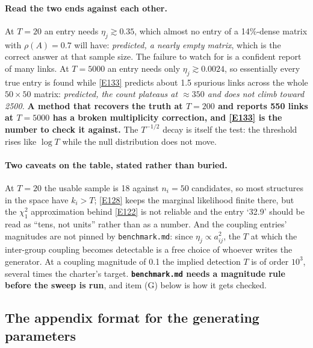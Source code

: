 \paragraph{Read the two ends against each other.} At $T=20$ an entry needs
$\eta_j\gtrsim0.35$, which almost no entry of a 14\%-dense matrix with $\rho(A)=0.7$
will have: \emph{predicted, a nearly empty matrix}, which is the correct answer at
that sample size. The failure to watch for is a confident report of many links. At
$T=5000$ an entry needs only $\eta_j\gtrsim0.0024$, so essentially every true entry
is found while \eqref{E133} predicts about 1.5 spurious links across the whole
$50\times50$ matrix: \emph{predicted, the count plateaus at $\approx350$ and does not
climb toward 2500.} \textbf{A method that recovers the truth at $T=200$ and reports
550 links at $T=5000$ has a broken multiplicity correction, and \eqref{E133} is the
number to check it against.} The $T^{-1/2}$ decay is itself the test: the threshold
rises like $\log T$ while the null distribution does not move.

\paragraph{Two caveats on the table, stated rather than buried.} At $T=20$ the usable
sample is 18 against $n_i=50$ candidates, so most structures in the space have
$k_i>T$; \eqref{E128} keeps the marginal likelihood finite there, but the $\chi^2_1$
approximation behind \eqref{E122} is not reliable and the entry `32.9' should be read
as ``tens, not units'' rather than as a number. And the coupling entries' magnitudes
are not pinned by \texttt{benchmark.md}: since $\eta_j\propto a_{ij}^2$, the $T$ at
which the inter-group coupling becomes detectable is a free choice of whoever writes
the generator. At a coupling magnitude of 0.1 the implied detection $T$ is of order
$10^3$, several times the charter's target. \textbf{\texttt{benchmark.md} needs a
magnitude rule before the sweep is run}, and item (G) below is how it gets checked.

\subsection[Format for the generating parameters]{The appendix format for the generating parameters}\label{sec:appfmt}


